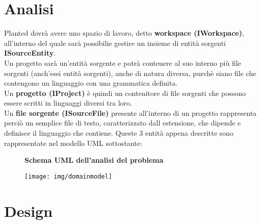 \documentclass{article}
\begin{document}
  \section{Analisi}
  Planted dovrà avere uno spazio di lavoro, detto \textbf{workspace (IWorkspace)}, all'interno del quale sarà possibilie gestire un insieme di entità sorgenti \textbf{ISourceEntity}.\\
  Un progetto sarà un'entità sorgente e potrà contenere al suo interno più file sorgenti (anch'essi entità sorgenti), anche di natura diversa, purchè siano file che contengono un linguaggio
  con una grammatica definita.\\
  Un \textbf{progetto (IProject)} è quindi un contenitore di file sorgenti che possono essere scritti in linguaggi diversi tra loro.\\
  Un \textbf{file sorgente (ISourceFile)} presente all'interno di un progetto rappresenta perciò un semplice file di testo, caratterizzato dall estensione,
  che dipende e definisce il linguaggio che contiene.
  Queste 3 entità appena descritte sono rappresentate nel modello UML sottostante:
  \begin{figure}[H]
    \centering
    \begin{framed}
      \textbf{Schema UML dell'analisi del problema}\par\medskip
      \texttt{[image: img/domainmodel]}
    \end{framed}
  \end{figure}
  \section{Design}
\end{document}
